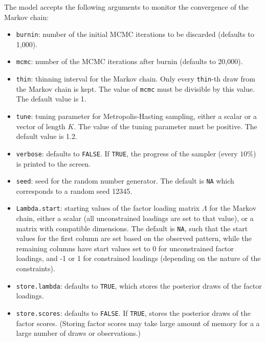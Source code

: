 The model accepts the following arguments to monitor the convergence
of the Markov chain:  
\begin{itemize}
\item \texttt{burnin}: number of the initial MCMC iterations to be 
 discarded (defaults to 1,000).

\item \texttt{mcmc}: number of the MCMC iterations after burnin
(defaults to 20,000).

\item \texttt{thin}: thinning interval for the Markov chain. Only every 
 \texttt{thin}-th draw from the Markov chain is kept. The value of
\texttt{mcmc} must be divisible by this value. The default value is 1.

\item \texttt{tune}: tuning parameter for Metropolis-Hasting sampling,
either a scalar or a vector of length $K$. The value of the tuning
parameter must be positive. The default value is 1.2.

\item \texttt{verbose}: defaults to {\tt FALSE}. If \texttt{TRUE}, the
progress of the sampler (every $10\%$) is printed to the screen.

\item \texttt{seed}: seed for the random number generator. The 
default is \texttt{NA} which corresponds to a random seed 12345. 

\item \texttt{Lambda.start}: starting values of the factor loading
matrix $\Lambda$ for the Markov chain, either a scalar (all
unconstrained loadings are set to that value), or a matrix with
compatible dimensions.  The default is {\tt NA}, such that the start
values for the first column are set based on the observed pattern,
while the remaining columns have start values set to 0 for
unconstrained factor loadings, and -1 or 1 for constrained loadings
(depending on the nature of the constraints).  

\item \texttt{store.lambda}: defaults to {\tt TRUE}, which stores the
posterior draws of the factor loadings.  

\item \texttt{store.scores}: defaults to {\tt FALSE}.  If {\tt TRUE},
stores the posterior draws of the factor scores.  (Storing factor
scores may take large amount of memory for a a large number of draws
or observations.)

\end{itemize}


